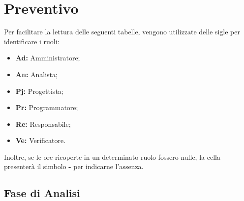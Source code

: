 \section{Preventivo}
Per facilitare la lettura delle seguenti tabelle, vengono utilizzate delle sigle 
per identificare i ruoli:
\begin{itemize}
\item \textbf{Ad:} Amministratore;
\item \textbf{An:} Analista;
\item \textbf{Pj:} Progettista;
\item \textbf{Pr:} Programmatore;
\item \textbf{Re:} Responsabile;
\item \textbf{Ve:} Verificatore.
\end{itemize}

Inoltre, se le ore ricoperte in un determinato ruolo fossero nulle, la cella 
presenterà il simbolo \textbf{-} per indicarne l'assenza. 

\subsection{Fase di Analisi}
